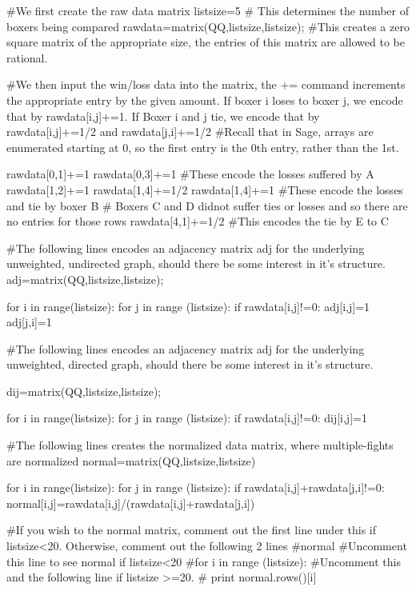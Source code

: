 \documentclass{ximera}
\begin{document}
 \begin{sageCell}
 #We first create the raw data matrix
listsize=5 # This determines the number of boxers being compared
rawdata=matrix(QQ,listsize,listsize); #This creates a zero square matrix of the appropriate size, the entries of this matrix are allowed to be rational.

#We then input the win/loss data into the matrix, the += command increments the appropriate entry by the given amount.  If boxer i loses to boxer j, we encode that by rawdata[i,j]+=1.  If Boxer i and j tie, we encode that by rawdata[i,j]+=1/2 and rawdata[j,i]+=1/2
#Recall that in Sage, arrays are enumerated starting at 0, so the first entry is the 0th entry, rather than the 1st.

rawdata[0,1]+=1
rawdata[0,3]+=1 #These encode the losses suffered by A
rawdata[1,2]+=1
rawdata[1,4]+=1/2
rawdata[1,4]+=1 #These encode the losses and tie by boxer B
# Boxers C and D didnot suffer ties or losses and so there are no entries for those rows
rawdata[4,1]+=1/2 #This encodes the tie by E to C

#The following lines encodes an adjacency matrix adj for the underlying unweighted, undirected graph, should there be some interest in it's structure.
adj=matrix(QQ,listsize,listsize);

for i in range(listsize):
    for j in range (listsize):
        if rawdata[i,j]!=0:
            adj[i,j]=1
            adj[j,i]=1

            
            
#The following lines encodes an adjacency matrix adj for the underlying unweighted, directed graph, should there be some interest in it's structure.

dij=matrix(QQ,listsize,listsize);

for i in range(listsize):
    for j in range (listsize):
        if rawdata[i,j]!=0:
            dij[i,j]=1


#The following lines creates the normalized data matrix, where multiple-fights are normalized
normal=matrix(QQ,listsize,listsize)

for i in range(listsize):
    for j in range (listsize):
        if rawdata[i,j]+rawdata[j,i]!=0:
            normal[i,j]=rawdata[i,j]/(rawdata[i,j]+rawdata[j,i]) 

#If you wish to the normal matrix, comment out the first line under this if listsize<20.  Otherwise, comment out the following 2 lines
#normal #Uncomment this line to see normal if listsize<20
#for i in range (listsize): #Uncomment this and the following line if listsize >=20.
#    print normal.rows()[i]



\end{sageCell}
\end{document}
